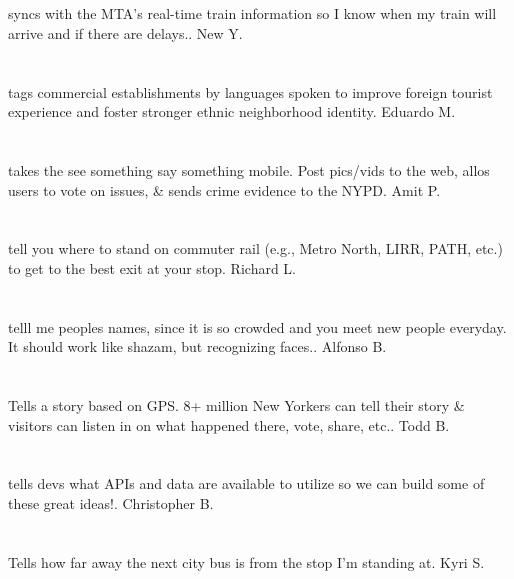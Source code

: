 \section{}syncs with the MTA's real-time train information so I know when my train will arrive and if there are delays.. New Y.
\section{}tags commercial establishments by languages spoken to improve foreign tourist experience and foster stronger ethnic neighborhood identity. Eduardo M.
\section{}takes the see something say something mobile. Post pics/vids to the web,  allos users to vote on issues,  \& sends crime evidence to the NYPD. Amit P.
\section{} tell you where to stand on commuter rail (e.g.,  Metro North,  LIRR,  PATH,  etc.) to get to the best exit at your stop. Richard L.
\section{}telll me peoples names,  since  it is so crowded and you meet new people everyday. It should work like  shazam,  but recognizing faces.. Alfonso B.
\section{}Tells a story based on GPS. 8+ million New Yorkers can tell their story \& visitors can listen in on what happened there,  vote,  share,  etc.. Todd B.
\section{}tells devs what APIs and data are available to utilize so we can build some of these great ideas!. Christopher B.
\section{}Tells how far away the next city bus is from the stop I'm standing at. Kyri S.
